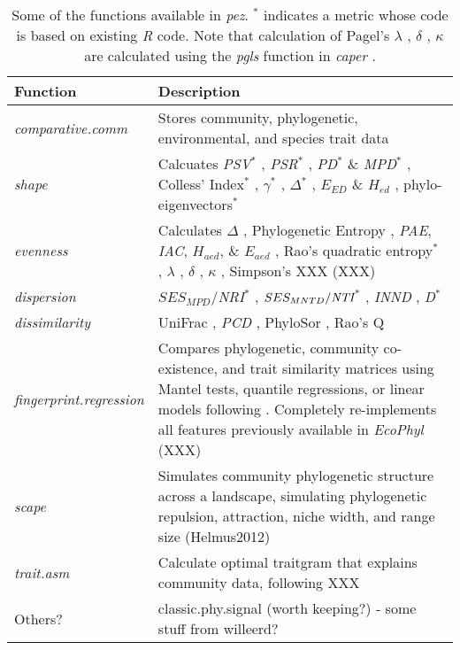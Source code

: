 \documentclass[11pt]{article} %
\begin{document}
\begin{table}
\begin{center}
\begin{tabular}{p{3.5cm} p{14cm}}
  Function & Description\\\hline
  \emph{comparative.comm} & Stores community, phylogenetic, environmental, and species trait data\\
  \emph{shape} & Calcuates \emph{PSV}$^*$ \autocite{Helmus2007}, \emph{PSR}$^*$ \autocite{Helmus2007}, \emph{PD}$^*$ \& \emph{MPD}$^*$ \autocite{Faith1992}, Colless' Index$^*$ \autocite{Colless1982}, $\gamma$$^*$ \autocite{Pybus2000}, $\Delta$$^*$ \autocite{Warwick1995}, $E_{ED}$ \& $H_{ed}$ \autocite{Cadotte2010}, phylo-eigenvectors$^*$ \autocite{Diniz-Filho2011}\\
  \emph{evenness} & Calculates $\Delta$ \autocite{Warwick1995}, Phylogenetic Entropy \autocite{Allen2009}, \emph{PAE}, \emph{IAC}, $H_{aed}$, \& $E_{aed}$ \autocite{Cadotte2010}, Rao's quadratic entropy$^*$ \autocite{Rao1982a}, $\lambda$ \autocite{Pagel1999}, $\delta$ \autocite{Pagel1999}, $\kappa$ \autocite{Pagel1999}, Simpson's XXX (XXX)\\
  \emph{dispersion} & $SES_{MPD}$/\emph{NRI}$^*$ \autocite{Webb2000,Webb2002,Kembel2009}, $SES_{MNTD}/\emph{NTI}$$^*$ \autocite{Webb2000,Webb2002,Kembel2009}, \emph{INND} \autocite{Ness2011}, \emph{D}$^*$ \autocite{Fritz2010}\\
\emph{dissimilarity} &  UniFrac \autocite{Lozupone2005}, \emph{PCD} \autocite{Helmus2010}, PhyloSor \autocite{Bryant2008}, Rao's Q \autocite{Rao1982a}\\
  \emph{fingerprint.regression} & Compares phylogenetic, community co-existence, and trait similarity matrices using Mantel tests, quantile regressions, or linear models following \autocite{Cavender-Bares2004,Cavender-Bares2006}. Completely re-implements all features previously available in \emph{EcoPhyl} (XXX) \\
  \emph{scape} & Simulates community phylogenetic structure across a landscape, simulating phylogenetic repulsion, attraction, niche width, and range size (Helmus2012)\\ %
  \emph{trait.asm} & Calculate optimal traitgram that explains community data, following XXX\\
  Others? & classic.phy.signal (worth keeping?) - some stuff from willeerd?\\
  \hline
\end{tabular}
\caption{Some of the functions available in \emph{pez}. $^*$ indicates
  a metric whose code is based on existing \emph{R} code. Note that
  calculation of Pagel's $\lambda$ \autocite{Pagel1999}, $\delta$
  \autocite{Pagel1999}, $\kappa$ \autocite{Pagel1999} are calculated
  using the \emph{pgls} function in \emph{caper} \autocite{Orme2013}.}
\label{metricTable}
\end{center}
\end{table}
\end{document}
